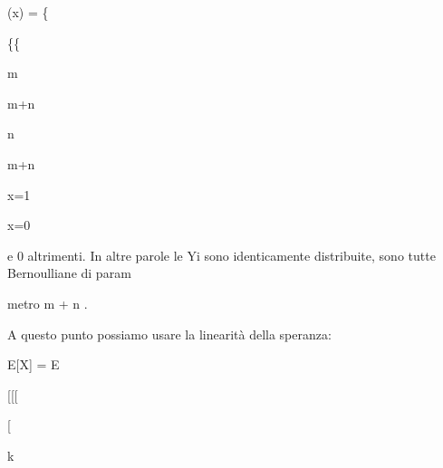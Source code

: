 \documentclass[a4paper,portrait,12pt]{article}
\begin{document}
\begin{flushleft}
(x) = \{
\end{flushleft}


\{\{





\begin{flushleft}
m
\end{flushleft}


\begin{flushleft}
m+n
\end{flushleft}


\begin{flushleft}
n
\end{flushleft}


\begin{flushleft}
m+n
\end{flushleft}





\begin{flushleft}
x=1
\end{flushleft}


\begin{flushleft}
x=0
\end{flushleft}





\begin{flushleft}
e 0 altrimenti. In altre parole le Yi sono identicamente distribuite, sono tutte Bernoulliane di param
\end{flushleft}


\begin{flushleft}
metro m + n .
\end{flushleft}


\begin{flushleft}
A questo punto possiamo usare la linearit\`{a} della speranza:
\end{flushleft}


\begin{flushleft}
E[X] = E
\end{flushleft}





[[[


[





\begin{flushleft}
k
\end{flushleft}
\end{document}
